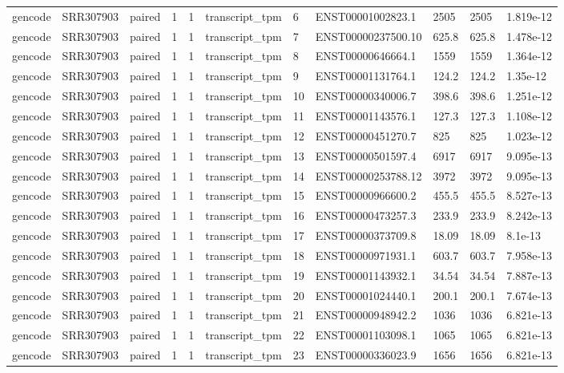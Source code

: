 \begin{tabular}{lllllllllll}
gencode & SRR307903 & paired & 1 & 1 & transcript\_tpm & 6 & ENST00001002823.1 & 2505 & 2505 & 1.819e-12 \\
gencode & SRR307903 & paired & 1 & 1 & transcript\_tpm & 7 & ENST00000237500.10 & 625.8 & 625.8 & 1.478e-12 \\
gencode & SRR307903 & paired & 1 & 1 & transcript\_tpm & 8 & ENST00000646664.1 & 1559 & 1559 & 1.364e-12 \\
gencode & SRR307903 & paired & 1 & 1 & transcript\_tpm & 9 & ENST00001131764.1 & 124.2 & 124.2 & 1.35e-12 \\
gencode & SRR307903 & paired & 1 & 1 & transcript\_tpm & 10 & ENST00000340006.7 & 398.6 & 398.6 & 1.251e-12 \\
gencode & SRR307903 & paired & 1 & 1 & transcript\_tpm & 11 & ENST00001143576.1 & 127.3 & 127.3 & 1.108e-12 \\
gencode & SRR307903 & paired & 1 & 1 & transcript\_tpm & 12 & ENST00000451270.7 & 825 & 825 & 1.023e-12 \\
gencode & SRR307903 & paired & 1 & 1 & transcript\_tpm & 13 & ENST00000501597.4 & 6917 & 6917 & 9.095e-13 \\
gencode & SRR307903 & paired & 1 & 1 & transcript\_tpm & 14 & ENST00000253788.12 & 3972 & 3972 & 9.095e-13 \\
gencode & SRR307903 & paired & 1 & 1 & transcript\_tpm & 15 & ENST00000966600.2 & 455.5 & 455.5 & 8.527e-13 \\
gencode & SRR307903 & paired & 1 & 1 & transcript\_tpm & 16 & ENST00000473257.3 & 233.9 & 233.9 & 8.242e-13 \\
gencode & SRR307903 & paired & 1 & 1 & transcript\_tpm & 17 & ENST00000373709.8 & 18.09 & 18.09 & 8.1e-13 \\
gencode & SRR307903 & paired & 1 & 1 & transcript\_tpm & 18 & ENST00000971931.1 & 603.7 & 603.7 & 7.958e-13 \\
gencode & SRR307903 & paired & 1 & 1 & transcript\_tpm & 19 & ENST00001143932.1 & 34.54 & 34.54 & 7.887e-13 \\
gencode & SRR307903 & paired & 1 & 1 & transcript\_tpm & 20 & ENST00001024440.1 & 200.1 & 200.1 & 7.674e-13 \\
gencode & SRR307903 & paired & 1 & 1 & transcript\_tpm & 21 & ENST00000948942.2 & 1036 & 1036 & 6.821e-13 \\
gencode & SRR307903 & paired & 1 & 1 & transcript\_tpm & 22 & ENST00001103098.1 & 1065 & 1065 & 6.821e-13 \\
gencode & SRR307903 & paired & 1 & 1 & transcript\_tpm & 23 & ENST00000336023.9 & 1656 & 1656 & 6.821e-13 \\

\end{tabular}
